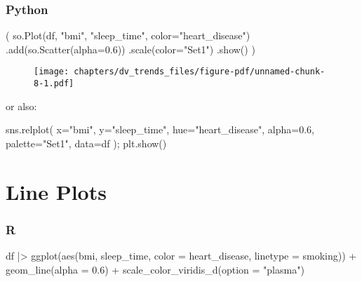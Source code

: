 \documentclass[
  letterpaper,
  DIV=11,
  numbers=noendperiod]{scrreprt}
\newenvironment{Shaded}{\begin{snugshade}}{\end{snugshade}}
\newcommand{\AttributeTok}[1]{\textcolor[rgb]{0.40,0.46,0.14}{#1}}
\newcommand{\FloatTok}[1]{\textcolor[rgb]{0.68,0.00,0.00}{#1}}
\newcommand{\FunctionTok}[1]{\textcolor[rgb]{0.28,0.35,0.67}{#1}}
\newcommand{\NormalTok}[1]{\textcolor[rgb]{0.00,0.46,0.62}{#1}}
\newcommand{\OperatorTok}[1]{\textcolor[rgb]{0.37,0.37,0.37}{#1}}
\newcommand{\SpecialCharTok}[1]{\textcolor[rgb]{0.37,0.37,0.37}{#1}}
\newcommand{\StringTok}[1]{\textcolor[rgb]{0.13,0.47,0.30}{#1}}
\begin{document}
\hypertarget{python-40}{%
\subsubsection{Python}\label{python-40}}

\begin{Shaded}
\begin{Highlighting}[]
\NormalTok{(}
\NormalTok{    so.Plot(df, }\StringTok{"bmi"}\NormalTok{, }\StringTok{"sleep\_time"}\NormalTok{, color}\OperatorTok{=}\StringTok{"heart\_disease"}\NormalTok{)}
\NormalTok{    .add(so.Scatter(alpha}\OperatorTok{=}\FloatTok{0.6}\NormalTok{))}
\NormalTok{    .scale(color}\OperatorTok{=}\StringTok{"Set1"}\NormalTok{)}
\NormalTok{    .show()}
\NormalTok{)}
\end{Highlighting}
\end{Shaded}

\begin{figure}[H]

{\centering \texttt{[image: chapters/dv\_trends\_files/figure-pdf/unnamed-chunk-8-1.pdf]}

}

\end{figure}

or also:

\begin{Shaded}
\begin{Highlighting}[]
\NormalTok{sns.relplot(}
\NormalTok{    x}\OperatorTok{=}\StringTok{"bmi"}\NormalTok{, y}\OperatorTok{=}\StringTok{"sleep\_time"}\NormalTok{, hue}\OperatorTok{=}\StringTok{"heart\_disease"}\NormalTok{,}
\NormalTok{    alpha}\OperatorTok{=}\FloatTok{0.6}\NormalTok{,}
\NormalTok{    palette}\OperatorTok{=}\StringTok{"Set1"}\NormalTok{,}
\NormalTok{    data}\OperatorTok{=}\NormalTok{df}
\NormalTok{)}\OperatorTok{;}
\NormalTok{plt.show()}
\end{Highlighting}
\end{Shaded}

\hypertarget{line-plots}{%
\section{Line Plots}\label{line-plots}}

\hypertarget{r-41}{%
\subsubsection{R}\label{r-41}}

\begin{Shaded}
\begin{Highlighting}[]
\NormalTok{df }\SpecialCharTok{|\textgreater{}} 
    \FunctionTok{ggplot}\NormalTok{(}\FunctionTok{aes}\NormalTok{(bmi, sleep\_time, }\AttributeTok{color =}\NormalTok{ heart\_disease, }\AttributeTok{linetype =}\NormalTok{ smoking)) }\SpecialCharTok{+}
    \FunctionTok{geom\_line}\NormalTok{(}\AttributeTok{alpha =} \FloatTok{0.6}\NormalTok{) }\SpecialCharTok{+}
    \FunctionTok{scale\_color\_viridis\_d}\NormalTok{(}\AttributeTok{option =} \StringTok{"plasma"}\NormalTok{)}
\end{Highlighting}
\end{Shaded}
\end{document}
